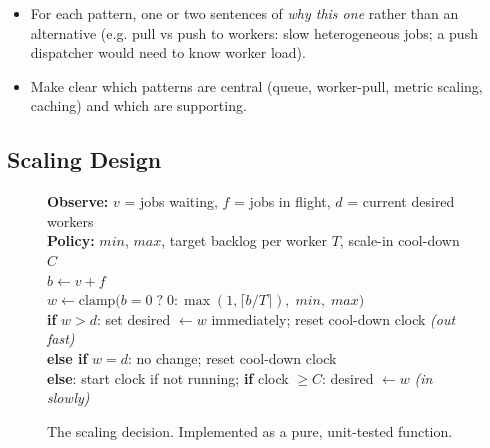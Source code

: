 \documentclass[a4paper,12pt]{article}
\begin{document}
\begin{yourwriting}
\begin{itemize}
    \item For each pattern, one or two sentences of \emph{why this one} rather than an alternative (e.g. pull vs push to workers: slow heterogeneous jobs; a push dispatcher would need to know worker load).
    \item Make clear which patterns are central (queue, worker-pull, metric scaling, caching) and which are supporting.
\end{itemize}
\end{yourwriting}

\subsection{Scaling Design}

\begin{figure}[H]
\centering
\begin{tcolorbox}[colback=softPurple, colframe=ffViolet, width=0.92\linewidth, arc=1mm, boxrule=0.5pt,
                  title={\small Algorithm 1: target tracking on backlog per worker (every 10\,s)}, fonttitle=\bfseries]
\small
\textbf{Observe:} $v$ = jobs waiting, $f$ = jobs in flight, $d$ = current desired workers\\
\textbf{Policy:} $min$, $max$, target backlog per worker $T$, scale-in cool-down $C$\\[0.3em]
$b \leftarrow v + f$\\
$w \leftarrow \mathrm{clamp}\big(b = 0 \;?\; 0 : \max(1, \lceil b / T \rceil),\; min,\; max\big)$\\
\textbf{if} $w > d$: set desired $\leftarrow w$ immediately; reset cool-down clock \hfill\emph{(out fast)}\\
\textbf{else if} $w = d$: no change; reset cool-down clock\\
\textbf{else}: start clock if not running; \textbf{if} clock $\geq C$: desired $\leftarrow w$ \hfill\emph{(in slowly)}
\end{tcolorbox}
\caption{The scaling decision. Implemented as a pure, unit-tested function.}
\label{fig:algorithm}
\end{figure}
\end{document}
